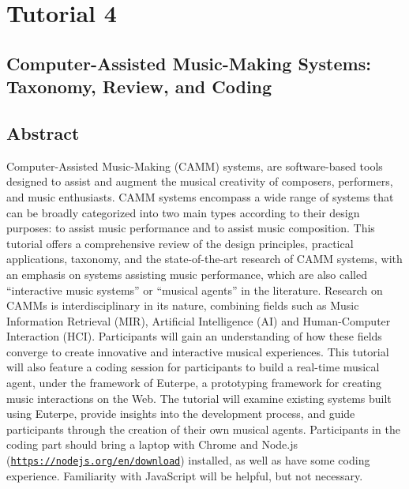 \clearpage


\section*{Tutorial 4}
{}
%
\subsection*{Computer-Assisted Music-Making Systems: Taxonomy, Review, and Coding}

\subsection*{Abstract}
Computer-Assisted Music-Making (CAMM) systems, are software-based tools designed to assist and augment the musical creativity of composers, performers, and music enthusiasts. CAMM systems encompass a wide range of systems that can be broadly categorized into two main types according to their design purposes: to assist music performance and to assist music composition. This tutorial offers a comprehensive review of the design principles, practical applications, taxonomy, and the state-of-the-art research of CAMM systems, with an emphasis on systems assisting music performance, which are also called ``interactive music systems'' or ``musical agents'' in the literature. Research on CAMMs is interdisciplinary in its nature, combining fields such as Music Information Retrieval (MIR), Artificial Intelligence (AI) and Human-Computer Interaction (HCI). Participants will gain an understanding of how these fields converge to create innovative and interactive musical experiences. This tutorial will also feature a coding session for participants to build a real-time musical agent, under the framework of Euterpe, a prototyping framework for creating music interactions on the Web. The tutorial will examine existing systems built using Euterpe, provide insights into the development process, and guide participants through the creation of their own musical agents. Participants in the coding part should bring a laptop with Chrome and Node.js (\href{https://nodejs.org/en/download}{\nolinkurl{https://nodejs.org/en/download}}) installed, as well as have some coding experience. Familiarity with JavaScript will be helpful, but not necessary.

